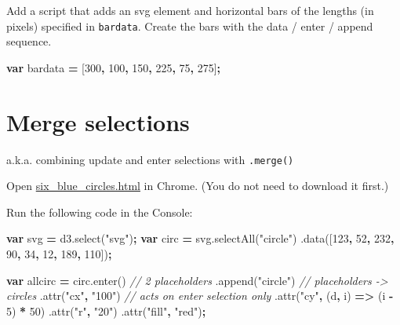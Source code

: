 \documentclass[openany]{book}
\newenvironment{Shaded}{\begin{snugshade}}{\end{snugshade}}
\newcommand{\AttributeTok}[1]{\textcolor[rgb]{0.77,0.63,0.00}{#1}}
\newcommand{\CommentTok}[1]{\textcolor[rgb]{0.56,0.35,0.01}{\textit{#1}}}
\newcommand{\DecValTok}[1]{\textcolor[rgb]{0.00,0.00,0.81}{#1}}
\newcommand{\KeywordTok}[1]{\textcolor[rgb]{0.13,0.29,0.53}{\textbf{#1}}}
\newcommand{\NormalTok}[1]{#1}
\newcommand{\OperatorTok}[1]{\textcolor[rgb]{0.81,0.36,0.00}{\textbf{#1}}}
\newcommand{\StringTok}[1]{\textcolor[rgb]{0.31,0.60,0.02}{#1}}
\newcommand{\VariableTok}[1]{\textcolor[rgb]{0.00,0.00,0.00}{#1}}
\begin{document}
Add a script that adds an svg element and horizontal bars of the lengths (in pixels) specified in \texttt{bardata}. Create the bars with the data / enter / append sequence.

\begin{Shaded}
\begin{Highlighting}[]
    \KeywordTok{var}\NormalTok{ bardata }\OperatorTok{=}\NormalTok{ [}\DecValTok{300}\OperatorTok{,} \DecValTok{100}\OperatorTok{,} \DecValTok{150}\OperatorTok{,} \DecValTok{225}\OperatorTok{,} \DecValTok{75}\OperatorTok{,} \DecValTok{275}\NormalTok{]}\OperatorTok{;}
\end{Highlighting}
\end{Shaded}

\hypertarget{merge-selections}{%
\section{Merge selections }\label{merge-selections}}

a.k.a. combining update and enter selections with \texttt{.merge()}

Open \href{code/six_blue_circles.html}{six\_blue\_circles.html} in Chrome. (You do not need to download it first.)

Run the following code in the Console:

\begin{Shaded}
\begin{Highlighting}[]
\KeywordTok{var}\NormalTok{ svg }\OperatorTok{=} \VariableTok{d3}\NormalTok{.}\AttributeTok{select}\NormalTok{(}\StringTok{"svg"}\NormalTok{)}\OperatorTok{;}
\KeywordTok{var}\NormalTok{ circ }\OperatorTok{=} \VariableTok{svg}\NormalTok{.}\AttributeTok{selectAll}\NormalTok{(}\StringTok{"circle"}\NormalTok{)}
\NormalTok{  .}\AttributeTok{data}\NormalTok{([}\DecValTok{123}\OperatorTok{,} \DecValTok{52}\OperatorTok{,} \DecValTok{232}\OperatorTok{,} \DecValTok{90}\OperatorTok{,} \DecValTok{34}\OperatorTok{,} \DecValTok{12}\OperatorTok{,} \DecValTok{189}\OperatorTok{,} \DecValTok{110}\NormalTok{])}\OperatorTok{;}
  
\KeywordTok{var}\NormalTok{ allcirc }\OperatorTok{=} \VariableTok{circ}\NormalTok{.}\AttributeTok{enter}\NormalTok{()  }\CommentTok{// 2 placeholders}
\NormalTok{        .}\AttributeTok{append}\NormalTok{(}\StringTok{"circle"}\NormalTok{)  }\CommentTok{// placeholders -> circles}
\NormalTok{          .}\AttributeTok{attr}\NormalTok{(}\StringTok{"cx"}\OperatorTok{,} \StringTok{"100"}\NormalTok{)  }\CommentTok{// acts on enter selection only}
\NormalTok{          .}\AttributeTok{attr}\NormalTok{(}\StringTok{"cy"}\OperatorTok{,}\NormalTok{ (d}\OperatorTok{,}\NormalTok{ i) }\OperatorTok{=>}\NormalTok{ (i }\OperatorTok{-} \DecValTok{5}\NormalTok{) }\OperatorTok{*} \DecValTok{50}\NormalTok{)}
\NormalTok{          .}\AttributeTok{attr}\NormalTok{(}\StringTok{"r"}\OperatorTok{,} \StringTok{"20"}\NormalTok{)}
\NormalTok{          .}\AttributeTok{attr}\NormalTok{(}\StringTok{"fill"}\OperatorTok{,} \StringTok{"red"}\NormalTok{)}\OperatorTok{;}
\end{Highlighting}
\end{Shaded}
\end{document}
